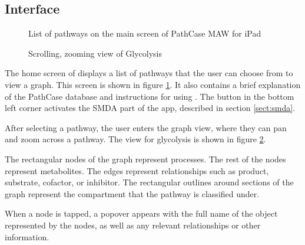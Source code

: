 \subsection{Interface}
\label{sect:maw_interface}

\begin{figure}[htb]
    \center{
        \texttt{[image: maw/figures/screenshot\_list]}}
    \caption{\label{fig:maw_screenshot_list} List of pathways on the main screen
    of PathCase MAW for iPad}
\end{figure}

\begin{figure}[hbt]
    \caption{\label{fig:maw_screenshot_pathway} Scrolling, zooming view of
    Glycolysis}
\end{figure}

The home screen of \mawapp displays a list of pathways that the user can
choose from to view a graph. This screen is shown in figure
\ref{fig:maw_screenshot_list}. It also contains a brief explanation of the
PathCase database and instructions for using \mawapp. The button in the bottom
left corner activates the SMDA part of the app, described in section
\ref{sect:smda}.

After selecting a pathway, the user enters the graph view, where they can pan
and zoom across a pathway. The view for glycolysis is shown in figure
\ref{fig:maw_screenshot_pathway}.

The rectangular nodes of the graph represent processes. The rest of the nodes
represent metabolites. The edges represent relationships such as product,
substrate, cofactor, or inhibitor. The rectangular outlines around sections of
the graph represent the compartment that the pathway is classified under.

When a node is tapped, a popover appears with the full name of the object
represented by the nodes, as well as any relevant relationships or other
information.
